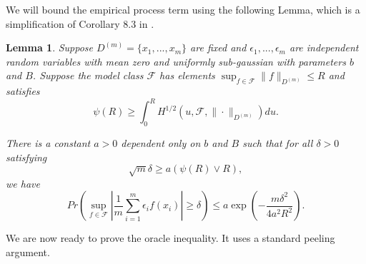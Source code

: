 \documentclass[10pt]{book}
\newtheorem{lemma}{Lemma}
\theoremstyle{definition}
\begin{document}
We will bound the empirical process term using the following Lemma, which is a simplification of Corollary 8.3 in \citet{van2000empirical}.

\begin{lemma}
	\label{lemma:cor83}
	Suppose $D^{(m)} = \{x_1,...,x_m\}$ are fixed and $\epsilon_1,...,\epsilon_m$ are independent random variables with mean zero and uniformly sub-gaussian with parameters $b$ and $B$. Suppose
	the model class $\mathcal{F}$ has elements $\sup_{f\in\mathcal{F}}\|f\|_{D^{(m)}}\le R$
	and satisfies
	\[
	\psi(R)\ge\int_{0}^{R}H^{1/2}(u,\mathcal{F},\|\cdot\|_{D^{(m)}})du.
	\]
	
	
	There is a constant $a > 0$ dependent only on $b$ and $B$ such that
	for all $\delta>0$ satisfying
	\[
	\sqrt{m}\delta\ge a(\psi(R)\vee R),
	\]
	we have 
	\[
	Pr\left(\sup_{f\in\mathcal{F}}\left|\frac{1}{m}\sum_{i=1}^{m}\epsilon_{i}f(x_{i})\right|\ge\delta\right)
	\le 
	a\exp\left(-\frac{m\delta^{2}}{4a^{2}R^{2}}\right).
	\]
	
\end{lemma}

We are now ready to prove the oracle inequality. It uses a standard peeling argument.
\end{document}
